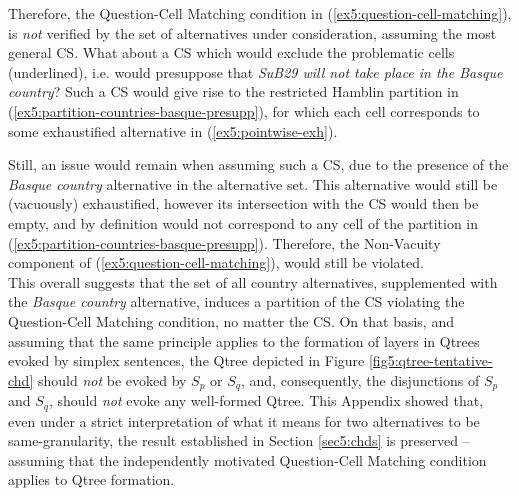 \begin{exe}
	\label{ex5:partition-countries-basque}
\end{exe}

Therefore, the Question-Cell Matching condition in (\ref{ex5:question-cell-matching}), is \textit{not} verified by the set of alternatives under consideration, assuming the most general CS. What about a CS which would exclude the problematic cells (underlined), i.e. would presuppose that \textit{SuB29 will not take place in the Basque country}? Such a CS would give rise to the restricted Hamblin partition in (\ref{ex5:partition-countries-basque-presupp}), for which each cell corresponds to some exhaustified alternative in (\ref{ex5:pointwise-exh}).
\begin{exe}
	\label{ex5:partition-countries-basque-presupp}
\end{exe}

Still, an issue would remain when assuming such a CS, due to the presence of the \textit{Basque country} alternative in the alternative set. This alternative would still be (vacuously) exhaustified, however its intersection with the CS would then be empty, and by definition would not correspond to any cell of the  partition in (\ref{ex5:partition-countries-basque-presupp}). Therefore, the Non-Vacuity component of (\ref{ex5:question-cell-matching}), would still be violated.\\

This overall suggests that the set of all country alternatives, supplemented with the \textit{Basque country} alternative, induces a partition of the CS violating the Question-Cell Matching condition, no matter the CS. On that basis, and assuming that the same principle applies to the formation of layers in Qtrees evoked by simplex sentences, the Qtree depicted in Figure \ref{fig5:qtree-tentative-chd} should \textit{not} be evoked by $S_p$ or $S_q$, and, consequently, the disjunctions of $S_p$ and $S_q$, should \textit{not} evoke any well-formed Qtree. This Appendix showed that, even under a strict interpretation of what it means for two alternatives to be same-granularity, the result established in Section \ref{sec5:chds} is preserved -- assuming that the independently motivated Question-Cell Matching condition applies to Qtree formation.








